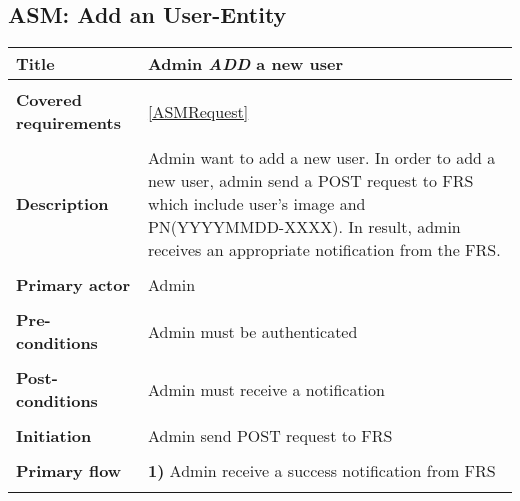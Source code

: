 \documentclass[a4paper,11pt]{article}
\begin{document}
\subsection{ASM: Add an User-Entity}

\begin{tabular}{|p{3.5cm}|p{11.5cm}|} \hline
    \textbf{Title} &   Admin \emph{ADD} a new user
        
    \\ \hline \rowcolor{Gray} & \\ \hline
    
    \textbf{Covered requirements} &  \ref{ASMRequest}
    
    \\ \hline \rowcolor{Gray} & \\ \hline
    
    \textbf{Description} &  Admin want to add a new user. In order to add a new user, admin send a POST request to FRS which include user's image and PN(YYYYMMDD-XXXX). In result, admin receives an appropriate notification from the FRS.
        
    \\ \hline \rowcolor{Gray} & \\ \hline
        
    \textbf{Primary actor} & Admin  
        
    \\ \hline \rowcolor{Gray} & \\ \hline 
          
    \textbf{Pre-conditions} &   Admin must be authenticated
        
    \\ \hline \rowcolor{Gray} & \\ \hline
         
    \textbf{Post-conditions} &   Admin must receive a notification
        
    \\ \hline \rowcolor{Gray} & \\ \hline 
         
    \textbf{Initiation} & Admin send POST request to FRS
        
    \\ \hline \rowcolor{Gray} & \\ \hline 
         
    \textbf{Primary flow} &
    \textbf{1)} Admin receive a success notification from FRS
        
    \\ \hline \rowcolor{Gray} & \\ \hline 
         

\end{tabular}
\end{document}
